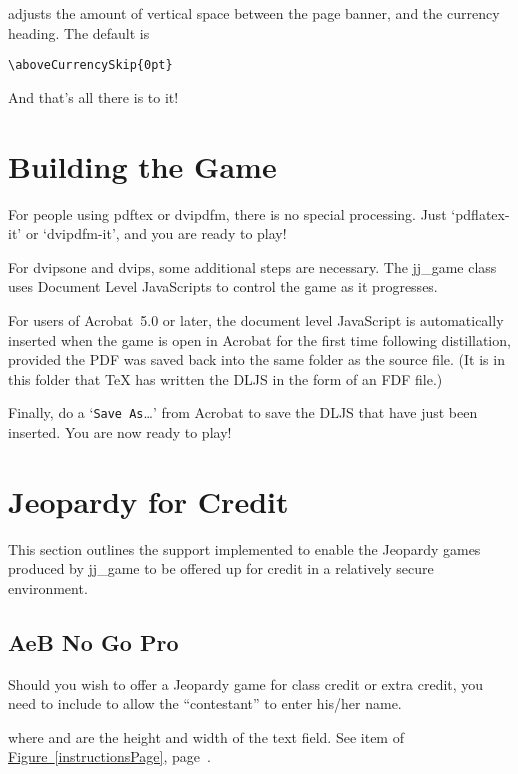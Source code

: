 \documentclass{article}
\def\jj{\textsf{jj\_game}}
\begin{document}
 adjusts the amount of vertical space between the page banner, and the currency
heading. The default is
\begin{Verbatim}[xleftmargin=\amtIndent]
\aboveCurrencySkip{0pt}
\end{Verbatim}

\newtopic\noindent And that's all there is to it!

\section{Building the Game}\label{s:buildgame}

For people using \textsf{pdftex} or \textsf{dvipdfm}, there is no
special processing. Just `\textsf{pdflatex}-it' or `\textsf{dvipdfm}-it',
and you are ready to play!

For \textsf{dvipsone} and \textsf{dvips}, some additional steps
are necessary. The \jj{} class uses Document Level JavaScripts to
control the game as it progresses.

For users of \textsf{Acrobat~5.0} or later, the document level
JavaScript is automatically inserted when the game is open in
\textsf{Acrobat} for the first time following distillation, provided
the \textsf{PDF} was saved back into the same folder as the source
file. (It is in this folder that \TeX{} has written the DLJS in the
form of an \textsf{FDF} file.)

Finally, do a `\texttt{Save As}\dots' from \textsf{Acrobat} to
save the DLJS that have just been inserted. You are now ready to play!

\section{Jeopardy for Credit}

This section outlines the support implemented to enable the Jeopardy games produced
by {\jj} to be offered up for credit in a relatively secure environment.

\subsection{AeB No Go Pro}

Should you wish to offer a Jeopardy game for class credit or extra
credit, you need to include  to allow the ``contestant'' to
enter his/her name.
\bVerb{}%
\begin{dCmd}[commandchars=!()]{\bxSize}
\end{dCmd}
\eVerb
where  and  are the height and width of the text
field. See item  of \hyperref[instructionsPage]{Figure~\ref*{instructionsPage}},
page~\pageref*{instructionsPage}.
\end{document}
